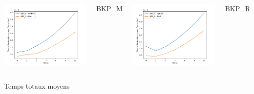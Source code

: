 \documentclass{beamer}
\begin{document}
\begin{frame}
\begin{columns}
  \includegraphics[width=\textwidth]{images/total_new_pyrust_BKP_M_plot.png}
  \caption{BKP\_M}%
  \centering
  \includegraphics[width=\textwidth]{images/total_new_pyrust_BKP_R_plot.png}
  \caption{BKP\_R}%
  \end{columns}
  \begin{center}
    Temps totaux moyens
  \end{center}
\end{frame}
\end{document}
